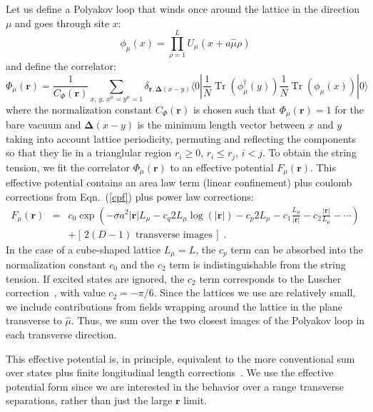 \documentclass[preprint,aps,prd]{revtex4-2}
\newcommand{\be}{\begin{equation}}
\newcommand{\eq}{\end{equation}}
\DeclareMathOperator{\Tr}{Tr}
\begin{document}
Let us define a Polyakov loop that winds once around the lattice
in the direction $\mu$ and goes through site $x$:
\be
         \phi_\mu(x)= \prod_{\rho=1}^L U_\mu(x+a \hat{\mu} \rho)
\eq
and define the correlator:
\be
\Phi_\mu(\mathbf{r}) = \frac{1}{C_\Phi(\mathbf{r})} \sum_{x, \,y,\, x^\mu = y^\mu =1}
           \delta_{\mathbf{r},\mathbf{\Delta}(x-y)}
           \langle 0 | \frac{1}{N} \Tr\left(\phi_\mu^\dagger(y)\right)
           \frac{1}{N} \Tr\left(\phi_\mu(x)\right) |0\rangle
           \label{pcorr}
\eq
%
where the normalization constant $C_\Phi(\mathbf{r})$ is chosen such that
$\Phi_\mu(\mathbf{r})=1$ for the bare vacuum and
$\mathbf{\Delta}(x-y)$ is the minimum length vector between
$x$ and $y$ taking into account lattice periodicity,
permuting and reflecting the components so that they lie
in a trianglular region $r_i\ge 0$, $r_i\le r_j$, $i<j$.
To obtain the string tension,
we fit the correlator $\Phi_\mu(\mathbf{r})$ to an effective
potential $F_\mu(\mathbf{r})$.
This effective potential contains an area law term (linear confinement)
plus coulomb corrections from Eqn.~(\ref{cpf}) plus power law corrections:
%
\begin{eqnarray}
         F_\mu(\mathbf{r}) &=& c_0 \exp\left(
         -\sigma a^2 \left|\mathbf{r}\right| L_\mu
         - c_q 2 L_\mu \log(\left|\mathbf{r}\right|) - c_p 2 L_\mu
         - c_1 \frac{L_\mu}{\left|\mathbf{r}\right|}
         - c_2 \frac{\left|\mathbf{r}\right|}{L_\mu} - \cdots \right)\nonumber\\
         & & + \left[\,\mbox{$2 (D-1)$ transverse images}\,\right]
         \; .  \label{stringmodel}
\end{eqnarray}
%
In the case of
a cube-shaped lattice $L_\mu = L$, the $c_p$ term can be absorbed into
the normalization constant $c_0$ and the $c_2$ term is indistinguishable from
the string tension.  If excited states are ignored, the $c_2$ term corresponds
to the Luscher correction~\cite{luscher_anomalies_1980}, with value
$c_2 = -\pi/6$.
Since the lattices we use are relatively small, we include contributions
from fields wrapping around the lattice in the plane transverse to
$\hat{\mu}$.  Thus, we sum over the two closest images of the Polyakov
loop in each transverse direction.

This effective potential is, in principle, equivalent to the more
conventional sum over states plus finite longitudinal length
corrections~\cite{teper_large_2009,aharony_effective_2013}.
We use the effective potential form since we are interested in
the behavior over a range transverse separations, rather than
just the large $\mathbf{r}$ limit.
\end{document}
